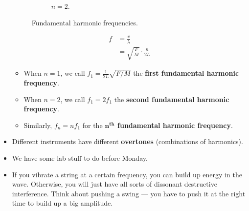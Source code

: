 \documentclass[../notes.tex]{subfiles}
\begin{document}
\begin{itemize}
\begin{figure}[H]
\begin{subfigure}[b]{0.49\linewidth}
            \caption{$n=2$.}
            \label{fig:harmonicFrequenciesb}
        \end{subfigure}
        \caption{Fundamental harmonic frequencies.}
        \label{fig:harmonicFrequencies}
    \end{figure}
    \vspace{-1em}
    \begin{align*}
        f &= \frac{v}{\lambda}\\
        &= \sqrt{\frac{F}{M}}\cdot\frac{n}{2L}
    \end{align*}
    \begin{itemize}
        \item When $n=1$, we call $f_1=\frac{1}{2L}\sqrt{F/M}$ the \textbf{first fundamental harmonic frequency}.
        \item When $n=2$, we call $f_1=2f_1$ the \textbf{second fundamental harmonic frequency}.
        \item Similarly, $f_n=nf_1$ for the \textbf{$\bm{n^\text{th}}$ fundamental harmonic frequency}.
    \end{itemize}
    \item Different instruments have different \textbf{overtones} (combinations of harmonics).
    \item We have some lab stuff to do before Monday.
    \item If you vibrate a string at a certain frequency, you can build up energy in the wave. Otherwise, you will just have all sorts of dissonant destructive interference. Think about pushing a swing --- you have to push it at the right time to build up a big amplitude.
\end{itemize}
\end{document}
